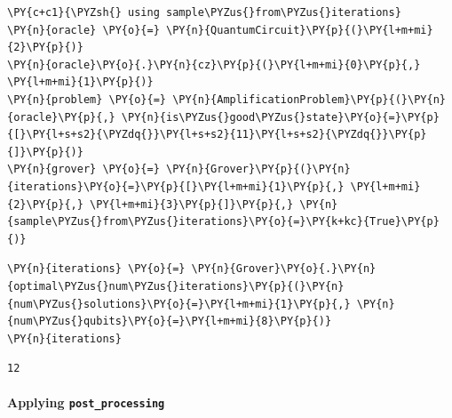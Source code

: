     \begin{tcolorbox}[breakable, size=fbox, boxrule=1pt, pad at break*=1mm,colback=cellbackground, colframe=cellborder]
\begin{Verbatim}[commandchars=\\\{\}]
\PY{c+c1}{\PYZsh{} using sample\PYZus{}from\PYZus{}iterations}
\PY{n}{oracle} \PY{o}{=} \PY{n}{QuantumCircuit}\PY{p}{(}\PY{l+m+mi}{2}\PY{p}{)}
\PY{n}{oracle}\PY{o}{.}\PY{n}{cz}\PY{p}{(}\PY{l+m+mi}{0}\PY{p}{,} \PY{l+m+mi}{1}\PY{p}{)}
\PY{n}{problem} \PY{o}{=} \PY{n}{AmplificationProblem}\PY{p}{(}\PY{n}{oracle}\PY{p}{,} \PY{n}{is\PYZus{}good\PYZus{}state}\PY{o}{=}\PY{p}{[}\PY{l+s+s2}{\PYZdq{}}\PY{l+s+s2}{11}\PY{l+s+s2}{\PYZdq{}}\PY{p}{]}\PY{p}{)}
\PY{n}{grover} \PY{o}{=} \PY{n}{Grover}\PY{p}{(}\PY{n}{iterations}\PY{o}{=}\PY{p}{[}\PY{l+m+mi}{1}\PY{p}{,} \PY{l+m+mi}{2}\PY{p}{,} \PY{l+m+mi}{3}\PY{p}{]}\PY{p}{,} \PY{n}{sample\PYZus{}from\PYZus{}iterations}\PY{o}{=}\PY{k+kc}{True}\PY{p}{)}
\end{Verbatim}
\end{tcolorbox}

    \begin{tcolorbox}[breakable, size=fbox, boxrule=1pt, pad at break*=1mm,colback=cellbackground, colframe=cellborder]
\begin{Verbatim}[commandchars=\\\{\}]
\PY{n}{iterations} \PY{o}{=} \PY{n}{Grover}\PY{o}{.}\PY{n}{optimal\PYZus{}num\PYZus{}iterations}\PY{p}{(}\PY{n}{num\PYZus{}solutions}\PY{o}{=}\PY{l+m+mi}{1}\PY{p}{,} \PY{n}{num\PYZus{}qubits}\PY{o}{=}\PY{l+m+mi}{8}\PY{p}{)}
\PY{n}{iterations}
\end{Verbatim}
\end{tcolorbox}

            \begin{tcolorbox}[breakable, size=fbox, boxrule=.5pt, pad at break*=1mm, opacityfill=0]
\begin{Verbatim}[commandchars=\\\{\}]
12
\end{Verbatim}
\end{tcolorbox}
        
    \hypertarget{applying-post_processing}{%
\paragraph{\texorpdfstring{Applying
\texttt{post\_processing}}{Applying post\_processing}}\label{applying-post_processing}}

